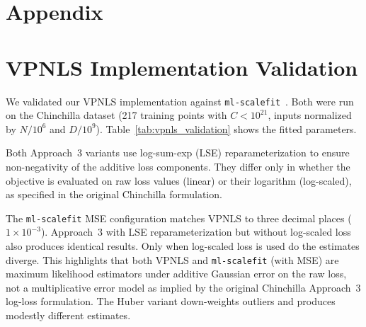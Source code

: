 \documentclass[11pt]{article}
\begin{document}



\appendix
\section*{Appendix}
\renewcommand{\thefigure}{A\arabic{figure}}
\setcounter{figure}{0}
\renewcommand{\thetable}{A\arabic{table}}
\setcounter{table}{0}

\section{VPNLS Implementation Validation}
\label{sec:appendix_vpnls_validation}

We validated our VPNLS implementation against
\texttt{ml-scalefit}~\citep{optimal_data_mixtures}.
Both were run on the Chinchilla dataset (217 training points
with $C < 10^{21}$, inputs normalized by $N/10^6$ and $D/10^9$).
Table~\ref{tab:vpnls_validation} shows the fitted parameters.

Both Approach~3 variants use log-sum-exp (LSE) reparameterization to ensure
non-negativity of the additive loss components. They differ only in whether the
objective is evaluated on raw loss values (linear) or their logarithm
(log-scaled), as specified in the original Chinchilla formulation.

The \texttt{ml-scalefit} MSE configuration matches VPNLS to three decimal
places ($1 \times 10^{-3}$). Approach~3 with LSE
reparameterization but without log-scaled loss also produces identical results.
Only when log-scaled loss is used do the estimates diverge. This highlights
that both VPNLS and \texttt{ml-scalefit} (with MSE) are maximum likelihood
estimators under additive Gaussian error on the raw loss, not a multiplicative
error model as implied by the original Chinchilla Approach~3 log-loss
formulation. The Huber variant down-weights outliers and produces modestly
different estimates.
\end{document}
